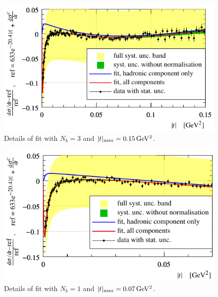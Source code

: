 \begin{figure}
\vskip-5mm
\begin{center}
\includegraphics{fig/fit_details_exp3_0p15.pdf}
\vskip-2mm
\caption{%
Details of fit with $N_b = 3$ and $|t|_{\rm max} = 0.15\,{\rm GeV^2}$. 
}
\label{fig:fit exp3 0.15}
\end{center}
\end{figure}


\begin{figure}
\vskip-5mm
\begin{center}
\includegraphics{fig/fit_details_exp1_0p07.pdf}
\vskip-2mm
\caption{%
Details of fit with $N_b = 1$ and $|t|_{\rm max} = 0.07\,{\rm GeV^2}$. 
}
\label{fig:fit exp1 0.07}
\end{center}
\end{figure}

